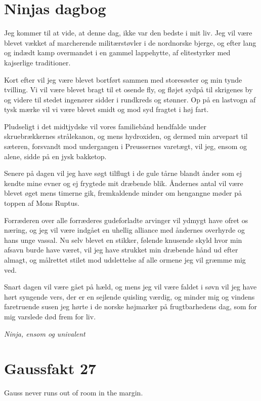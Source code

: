 

\begin{minipage}[b]{0.95\linewidth}
\begin{minipage}[t]{0.47\textwidth}
\vspace{3mm}
\section*{Ninjas dagbog}
Jeg kommer til at vide, at denne dag, ikke var den bedste i mit liv. Jeg vil være blevet vækket af marcherende militærstøvler i de nordnorske bjerge, og efter lang og indædt kamp overmandet i en gammel lappehytte, af elitestyrker med kajserlige traditioner.

Kort efter vil jeg være blevet bortført sammen med storesøster og min tynde tvilling. Vi vil være blevet bragt til et osende fly, og fløjet sydpå til skrigenes by og videre til stedet ingenører sidder i rundkreds og stønner. Op på en lastvogn af tysk mærke vil vi være blevet smidt og mod syd fragtet i høj fart.

Pludseligt i det midtjydske vil vores familiebånd hendfalde under skruebrækkernes strålekanon, og mens hydroxiden, og dermed min arvepart til sæteren, forsvandt mod undergangen i Preussernes varetægt, vil jeg, ensom og alene, sidde på en jysk bakketop.

Senere på dagen vil jeg have søgt tilflugt i de gule tårne blandt ånder som ej kendte mine evner og ej frygtede mit dræbende blik. Åndernes antal vil være blevet øget mens timerne gik, fremkaldende minder om hengangne møder på toppen af Mons Ruptus.

Forræderen over alle forræderes gudeforladte arvinger vil ydmygt have ofret os næring, og jeg vil være indgået en uhellig alliance med åndernes overhyrde og hans unge vassal. Nu selv blevet en stikker, følende knusende skyld hvor min afsavn burde have været, vil jeg have strukket min dræbende hånd ud efter almagt, og målrettet stilet mod udslettelse af alle ormene jeg vil græmme mig ved.

Snart dagen vil være gået på hæld, og mens jeg vil være faldet i søvn vil jeg have hørt syngende vers, der er en sejlende quisling værdig, og minder mig og vindens faretruende susen jeg hørte i de norske højmarker på frugtbarhedens dag, som for mig varslede død frem for liv.

{\flushright\emph{Ninja, ensom og univalent}}

\section*{Gaussfakt 27}
Gauss never runs out of room in the margin.


\end{minipage}
\end{minipage}
